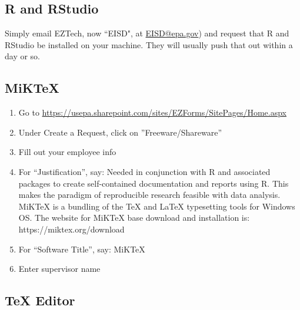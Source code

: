\documentclass{article}
\begin{document}
\subsection{R and RStudio}
Simply email EZTech, now ``EISD", at
\href{mailto:EISD@epa.gov}{EISD@epa.gov}) and request that R and
RStudio be installed on your machine. They will usually push that out
within a day or so.

\subsection{MiKTeX}
\begin{enumerate}
    \item Go to \url{https://usepa.sharepoint.com/sites/EZForms/SitePages/Home.aspx}
    \item Under Create a Request, click on ''Freeware/Shareware''
    \item Fill out your employee info
    \item For ``Justification'', say: Needed in conjunction with R and
      associated packages to create self-contained documentation and
      reports using R. This makes the paradigm of reproducible
      research feasible with data analysis. MiKTeX is a bundling of
      the TeX and LaTeX typesetting tools for Windows OS. The website
      for MiKTeX base download and installation is:
      https://miktex.org/download
    \item For ``Software Title'', say: MiKTeX
    \item Enter supervisor name
\end{enumerate}

\subsection{TeX Editor}

\end{document}
